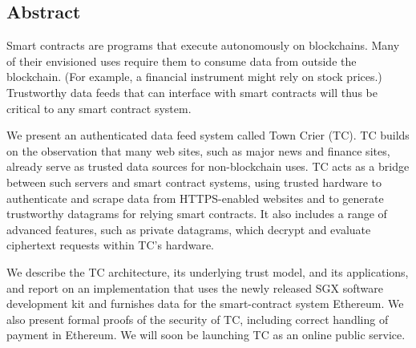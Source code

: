 \subsection*{Abstract}
Smart contracts are programs that execute autonomously on blockchains. Many of their envisioned uses require them to consume data from outside the blockchain. (For example, a financial instrument might rely on stock prices.) Trustworthy data feeds that can interface with smart contracts will thus be critical to any smart contract system. 

	We present an authenticated data feed system called Town Crier (TC). TC builds on the observation that many web sites, such as major news and finance sites, already serve as trusted data sources for non-blockchain uses. TC acts as a bridge between such servers and smart contract systems, using trusted hardware to authenticate and scrape data from HTTPS-enabled websites and to generate trustworthy datagrams for relying smart contracts. It also includes a range of advanced features, such as private datagrams, which decrypt and evaluate ciphertext requests within TC's hardware.
	
	We describe the TC architecture, its underlying trust model, and its applications, and report on an implementation that uses the newly released SGX software development kit and furnishes data for the smart-contract system Ethereum. We also present formal proofs of the security of TC, including correct handling of payment in Ethereum. We will soon be launching TC as an online public service.
